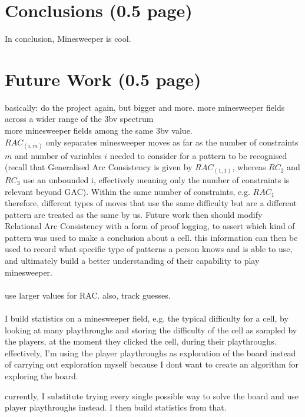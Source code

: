 \section{Conclusions (0.5 page)}
\label{sec:conclusions}
In conclusion, Minesweeper is cool.

\section{Future Work (0.5 page)}
\label{sec:future_work}
basically: do the project again, but bigger and more.
more minesweeper fields across a wider range of the 3bv spectrum \\
more minesweeper fields among the same 3bv value. \\

$RAC_{(i, m)}$ only separates minesweeper moves as far as the number of constraints $m$  and number of variables $i$ needed to consider for a pattern to be recognised (recall that Generalised Arc Consistency is given by $RAC_{(1,1)}$, whereas $RC_2$ and $RC_3$ use an unbounded i, effectively meaning only the number of constraints is relevant beyond GAC). Within the same number of constraints, e.g. $RAC_1$ therefore, different types of moves that use the same difficulty but are a different pattern are treated as the same by us.
Future work then should modify Relational Arc Consistency with a form of proof logging, to assert which kind of pattern was used to make a conclusion about a cell. this information can then be used to record what specific type of patterns a person knows and is able to use, and ultimately build a better understanding of their capability to play minesweeper.
\\ \\
use larger values for RAC. also, track guesses.
\\ \\
I build statistics on a minesweeper field, e.g. the typical difficulty for a cell,
by looking at many playthroughs and storing the difficulty of the cell as sampled by the players, at the moment they clicked the cell, during their playthroughs.
effectively, I'm using the player playthroughs as exploration of the board
instead of carrying out exploration myself
because I dont want to create an algorithm for exploring the board.

currently, I substitute trying every single possible way to solve the board and use player playthroughs instead.
I then build statistics from that.